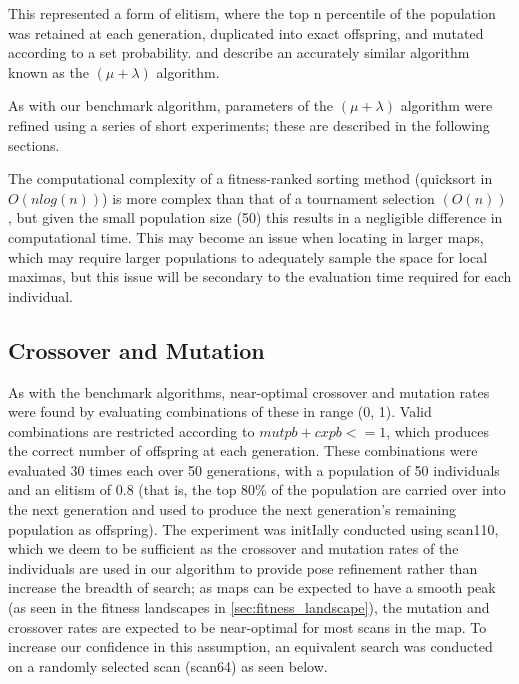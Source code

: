 \documentclass[authoryearcitations]{UoYCSproject}
\begin{document}
This represented a form of elitism, where the top n percentile of the population was retained at each generation, duplicated into exact offspring, and mutated according to a set probability. \citet{T_Back_D_B_Fogel_T_Michalewicz} and \citet{Shapiro1992-qm} describe an accurately similar algorithm known as the $(\mu + \lambda)$  algorithm.

As with our benchmark algorithm, parameters of the $(\mu + \lambda)$ algorithm were refined using a series of short experiments; these are described in the following sections.

The computational complexity of a fitness-ranked sorting method (quicksort in $O(n log (n))$) is more complex  \cite{Mitchell1998-td} than that of a tournament selection $(O(n))$ \cite{David_E_Goldberg1991-es}, but given the small population size (50) this results in a negligible difference in computational time. This may become an issue when locating in larger maps, which may require larger populations to adequately sample the space for local maximas, but this issue will be secondary to the evaluation time required for each individual.

\subsection{Crossover and Mutation}
\label{subsec:elite_cxpb_mupb}
As with the benchmark algorithms, near-optimal crossover and mutation rates were found by evaluating combinations of these in range (0, 1). Valid combinations are restricted according to $mutpb + cxpb <= 1$, which produces the correct number of offspring at each generation. These combinations were evaluated 30 times each over 50 generations, with a population of 50 individuals and an elitism of 0.8 (that is, the top 80\% of the population are carried over into the next generation and used to produce the next generation's remaining population as offspring). The experiment was initIally conducted using scan110, which we deem to be sufficient as the crossover and mutation rates of the individuals are used in our algorithm to provide pose refinement rather than increase the breadth of search; as maps can be expected to have a smooth peak (as seen in the fitness landscapes in \autoref{sec:fitness_landscape}), the mutation and crossover rates are expected to be near-optimal for most scans in the map. To increase our confidence in this assumption, an equivalent search was conducted on a randomly selected scan (scan64) as seen below.
\end{document}
